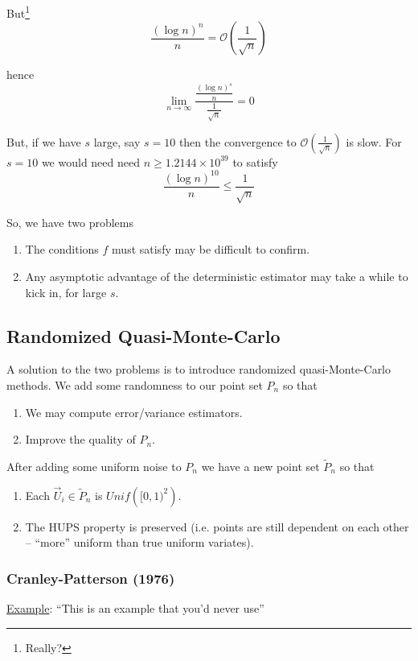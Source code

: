 \documentclass[12pt]{article}
\newlength\tindent
\renewcommand{\indent}{\hspace*{\tindent}}
\begin{document}
But\footnote{Really?}
\begin{equation*}
	\frac{ (\log n)^n }{ n } = \mathcal O\left( \frac{1}{\sqrt{n}} \right)
\end{equation*}

hence
\begin{equation*}
	\lim_{n\to\infty} \frac{ \frac{ (\log n)^s }{ n } }{ \frac{ 1 }{ \sqrt{n} }} = 0
\end{equation*}

But, if we have $s$ large, say $s = 10$ then the convergence to $\mathcal O \left( \frac{1}{\sqrt{n}} \right)$ is slow. For $s = 10$ we would need need $n \geq 1.2144 \times 10^{39}$ to satisfy 
\begin{equation*}
	\frac{ (\log n)^10 }{n} \leq \frac{1}{\sqrt{n}}
\end{equation*}

So, we have two problems
\begin{enumerate}
	\item The conditions $f$ must satisfy may be difficult to confirm.
	\item Any asymptotic advantage of the deterministic estimator may take a while to kick in, for large $s$.
\end{enumerate}

\subsection{Randomized Quasi-Monte-Carlo}

\indent A solution to the two problems is to introduce randomized quasi-Monte-Carlo methods. We add some randomness to our point set $P_n$ so that
\begin{enumerate}
	\item We may compute error/variance estimators.
	\item Improve the quality of $P_n$.
\end{enumerate}

After adding some uniform noise to $P_n$ we have a new point set $\tilde{P}_n$ so that
\begin{enumerate}
	\item Each $\vec{U}_i \in \tilde{P}_n$ is $Unif\left( [0,1)^2 \right)$.
	\item The HUPS property is preserved (i.e. points are still dependent on each other -- ``more'' uniform than true uniform variates).
\end{enumerate}

\subsubsection{Cranley-Patterson (1976)}
\underline{Example}: ``This is an example that you'd never use'' \\
\end{document}
